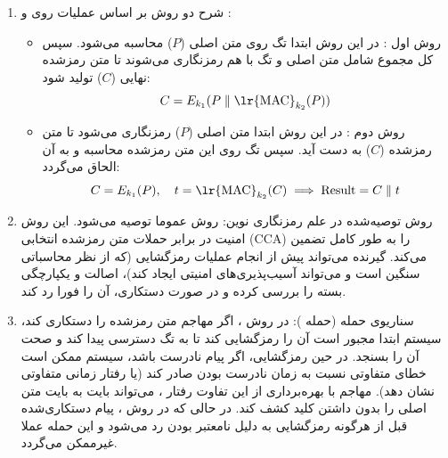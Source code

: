 
\begin{enumerate}
    \item {شرح دو روش بر اساس عملیات روی  و :}
    \begin{itemize}
        \item {روش اول :} در این روش ابتدا تگ  روی متن اصلی ($P$) محاسبه می‌شود. سپس کل مجموع شامل متن اصلی و تگ  با هم رمزنگاری می‌شوند تا متن رمزشده نهایی ($C$) تولید شود:
        $$C = E_{k_1}(P \parallel \text{\lr{MAC}}_{k_2}(P))$$
        \item {روش دوم :} در این روش ابتدا متن اصلی ($P$) رمزنگاری می‌شود تا متن رمزشده ($C$) به دست آید. سپس تگ  روی این متن رمزشده محاسبه و به آن الحاق می‌گردد:
        $$C = E_{k_1}(P), \quad t = \text{\lr{MAC}}_{k_2}(C) \implies \text{Result} = C \parallel t$$
    \end{itemize}

    \item {روش توصیه‌شده در علم رمزنگاری نوین:}
    روش  عموما توصیه می‌شود. 
    این روش امنیت در برابر حملات متن رمزشده انتخابی (CCA) را به طور کامل تضمین می‌کند. گیرنده می‌تواند پیش از انجام عملیات رمزگشایی (که از نظر محاسباتی سنگین است و می‌تواند آسیب‌پذیری‌های امنیتی ایجاد کند)، اصالت و یکپارچگی بسته را بررسی کرده و در صورت دستکاری، آن را فورا رد کند.

    \item {سناریوی حمله (حمله ):}
    در روش ، اگر مهاجم متن رمزشده را دستکاری کند، سیستم ابتدا مجبور است آن را رمزگشایی کند تا به تگ  دسترسی پیدا کند و صحت آن را بسنجد. در حین رمزگشایی، اگر  پیام نادرست باشد، سیستم ممکن است خطای متفاوتی نسبت به زمان نادرست بودن  صادر کند (یا رفتار زمانی متفاوتی نشان دهد). مهاجم با بهره‌برداری از این تفاوت رفتار ، می‌تواند بایت به بایت متن اصلی را بدون داشتن کلید کشف کند. در حالی که در روش ، پیام دستکاری‌شده قبل از هرگونه رمزگشایی به دلیل نامعتبر بودن  رد می‌شود و این حمله عملا غیرممکن می‌گردد.
\end{enumerate}


